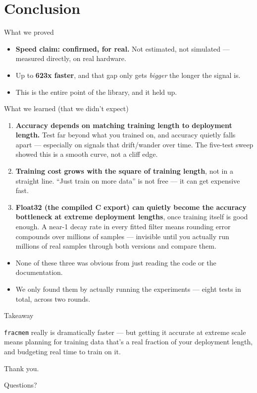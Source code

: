 \documentclass[11pt]{beamer}
\begin{document}
\section{Conclusion}

\begin{frame}{What we proved}
\begin{itemize}
\item \textbf{Speed claim: confirmed, for real.} Not estimated, not simulated --- measured directly, on real hardware.
\item Up to \textbf{623x faster}, and that gap only gets \emph{bigger} the longer the signal is.
\item This is the entire point of the library, and it held up.
\end{itemize}
\end{frame}

\begin{frame}{What we learned (that we didn't expect)}
\begin{enumerate}
\item \textbf{Accuracy depends on matching training length to deployment length.} Test far beyond what you trained on, and accuracy quietly falls apart --- especially on signals that drift/wander over time. The five-test sweep showed this is a smooth curve, not a cliff edge.
\item \textbf{Training cost grows with the square of training length}, not in a straight line. ``Just train on more data'' is not free --- it can get expensive fast.
\item \textbf{Float32 (the compiled C export) can quietly become the accuracy bottleneck at extreme deployment lengths}, once training itself is good enough. A near-1 decay rate in every fitted filter means rounding error compounds over millions of samples --- invisible until you actually run millions of real samples through both versions and compare them.
\end{enumerate}
\begin{itemize}
\item None of these three was obvious from just reading the code or the documentation.
\item We only found them by actually running the experiments --- eight tests in total, across two rounds.
\end{itemize}
\end{frame}

\begin{frame}{Takeaway}
\begin{block}{}
\centering
\Large \texttt{fracmem} really is dramatically faster --- but getting it accurate at extreme scale means planning for training data that's a real fraction of your deployment length, and budgeting real time to train on it.
\end{block}
\end{frame}

\begin{frame}
\centering
\Large Thank you.
\vspace{1em}

\normalsize Questions?
\end{frame}
\end{document}
